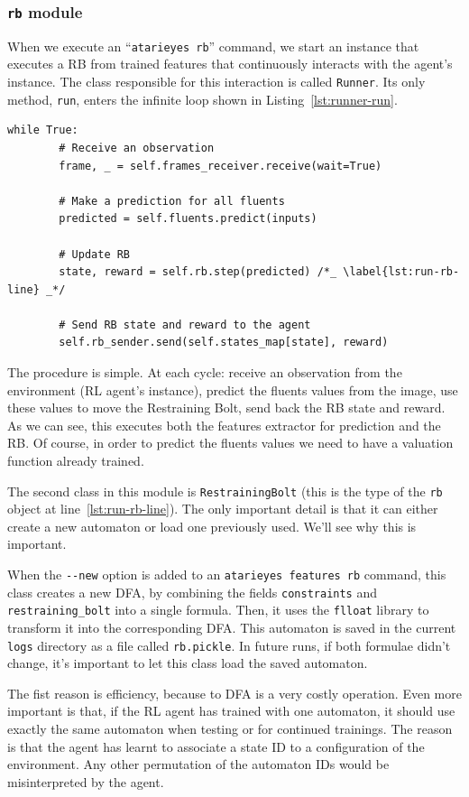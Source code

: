 \subsubsection*{\texttt{rb} module}

When we execute an ``\texttt{atarieyes rb}'' command, we start an instance
that executes a RB from trained features that continuously interacts with the
agent's instance. The class responsible for this interaction is called
\texttt{Runner}. Its only method, \texttt{run}, enters the infinite loop shown
in Listing~\ref{lst:runner-run}.
\begin{lstlisting}[style=floatpy, label=lst:runner-run,%
	caption={Infinite loop of \texttt{Runner.run} in the \texttt{rb} module.}]
while True:
		# Receive an observation
		frame, _ = self.frames_receiver.receive(wait=True)

		# Make a prediction for all fluents
		predicted = self.fluents.predict(inputs)

		# Update RB
		state, reward = self.rb.step(predicted) /*_ \label{lst:run-rb-line} _*/

		# Send RB state and reward to the agent
		self.rb_sender.send(self.states_map[state], reward)
\end{lstlisting}
The procedure is simple. At each cycle: receive an observation from the
environment (RL agent's instance), predict the fluents values from the image,
use these values to move the Restraining Bolt, send back the RB state and
reward. As we can see, this executes both the features extractor for
prediction and the RB. Of course, in order to predict the fluents values we
need to have a valuation function already trained.

The second class in this module is \texttt{RestrainingBolt} (this is the type
of the \texttt{rb} object at line~\ref{lst:run-rb-line}). The only important
detail is that it can either create a new automaton or load one previously
used. We'll see why this is important.

When the \verb|--new| option is added to an \verb|atarieyes features rb|
command, this class creates a new DFA, by combining the fields
\texttt{constraints} and \texttt{restraining\_bolt} into a single formula.
Then, it uses the \texttt{flloat} library to transform it into the
corresponding DFA. This automaton is saved in the current \texttt{logs}
directory as a file called \verb|rb.pickle|. In future runs, if both formulae
didn't change, it's important to let this class load the saved automaton.

The fist reason is efficiency, because \ldl{} to DFA is a very costly
operation. Even more important is that, if the RL agent has trained with one
automaton, it should use exactly the same automaton when testing or for
continued trainings. The reason is that the agent has learnt to associate a
state ID to a configuration of the environment. Any other permutation of the
automaton IDs would be misinterpreted by the agent.


